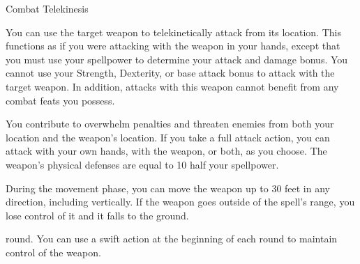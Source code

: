 \begin{spellsection}{Combat Telekinesis}
    \begin{spellheader}
    \end{spellheader}
    \begin{spellcontent}
        \begin{spelltargetinginfo}
            \spellrng{\rngclose}
        \end{spelltargetinginfo}
        \begin{spelleffects}
            \spelleffect You can use the target weapon to telekinetically attack from its location.
            This functions as if you were attacking with the weapon in your hands, except that you must use your spellpower to determine your attack and damage bonus.
            You cannot use your Strength, Dexterity, or base attack bonus to attack with the target weapon.
            In addition, attacks with this weapon cannot benefit from any combat feats you possess.

            You contribute to overwhelm penalties and threaten enemies from both your location and the weapon's location.
            If you take a full attack action, you can attack with your own hands, with the weapon, or both, as you choose.
            The weapon's physical defenses are equal to 10 \add half your spellpower.

            During the movement phase, you can move the weapon up to 30 feet in any direction, including vertically.
            If the weapon goes outside of the spell's range, you lose control of it and it falls to the ground.

             round. You can use a swift action at the beginning of each round to maintain control of the weapon.
        \end{spelleffects}
    \end{spellcontent}
    \begin{spellfooter}
    \end{spellfooter}
\end{spellsection}

